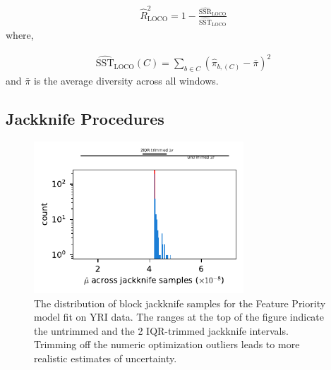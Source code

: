 \documentclass[11pt]{article}
\begin{document}
\begin{align}
    \widehat{R}_\text{LOCO}^2 = 1-\frac{\widehat{\mathrm{SSR}}_\text{LOCO}}{\widehat{\mathrm{SST}}_\text{LOCO}}
\end{align}
%
where, 

\begin{align}
    \widehat{\mathrm{SST}}_\text{LOCO}(C) = \sum_{b \in C} (\widehat{\pi}_{b, (C)}  - \bar{\pi})^2
\end{align}
%
and $\bar{\pi}$ is the average diversity across all windows.

\subsection{Jackknife Procedures}
\label{supp:jackknife}

\begin{figure}[htbp]
  \label{suppfig:jackknife-iqr}
  \centering
  \includegraphics[width=0.7\textwidth]{figures/supplementary/iqr_jackknife_trim.pdf}

  \caption{The distribution of block jackknife samples for the Feature Priority
  model fit on YRI data. The ranges at the top of the figure indicate the
untrimmed and the 2 IQR-trimmed jackknife intervals. Trimming off the numeric
optimization outliers leads to more realistic estimates of uncertainty.}

\end{figure}
\end{document}
